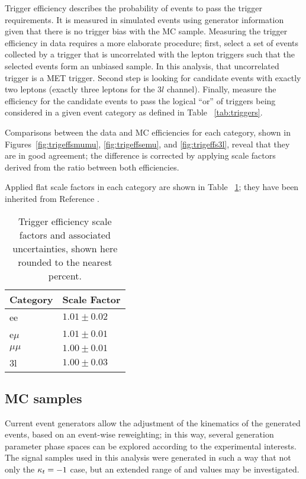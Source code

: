 Trigger efficiency describes the probability of events to pass the trigger requirements. It is measured in simulated events using generator information given that there is no trigger bias with the MC sample. Measuring the trigger efficiency in data requires a more elaborate procedure; first, select a set of events collected by a trigger that is uncorrelated with the lepton triggers such that the selected events form an unbiased sample. In this analysis, that uncorrelated trigger is a MET trigger. Second step is looking for candidate events with exactly two leptons (exactly three leptons for the $3l$ channel). Finally,  measure the efficiency for the candidate events to pass the logical ``or'' of triggers being considered in a given event category as defined in Table ~\ref{tab:triggers}.

Comparisons between the data and MC efficiencies for each category, shown in Figures~\ref{fig:trigeffsmumu}, \ref{fig:trigeffsemu}, and \ref{fig:trigeffs3l}, reveal that they are in good agreement; the difference is corrected by applying scale factors derived from the ratio between both efficiencies.

Applied flat scale factors in each category are shown in Table ~\ref{tab:trigSFs}; they have been inherited from Reference \cite{CMS_AN_2017-029}. 
\begin{table}
\centering
\begin{tabular}{ll}
Category & Scale Factor \\\hline
    ee   & $1.01 \pm 0.02$ \\
e$\mu$   & $1.01 \pm 0.01$ \\
$\mu\mu$ & $1.00 \pm 0.01$ \\
3l       & $1.00 \pm 0.03$ \\\hline
\end{tabular}
\caption[Trigger efficiency scale factors and associated uncertainties.]{Trigger efficiency scale factors and associated uncertainties, shown here rounded to the nearest percent.}
\label{tab:trigSFs}
\end{table}

\subsection{MC samples}

Current event generators allow the adjustment of the kinematics of the generated events, based on an event-wise reweighting; in this way, several generation parameter phase spaces can be explored according to the experimental interests. The signal samples used in this analysis were generated in such a way that not only the ${\kappa_t=-1}$ case, but an extended range of \Ct and \CV values may be investigated.

